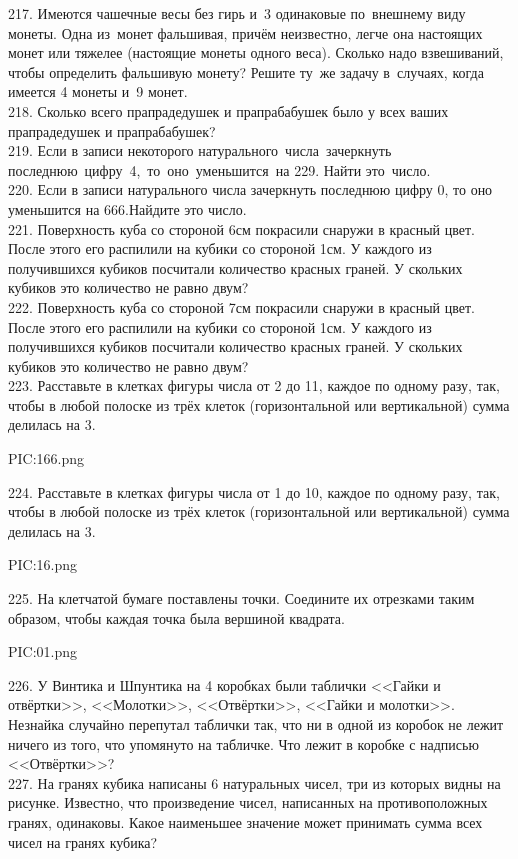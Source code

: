 217. Имеются чашечные весы без гирь и 3 одинаковые по внешнему виду монеты. Одна из монет фальшивая, причём неизвестно, легче она настоящих монет или тяжелее (настоящие монеты одного веса). Сколько надо взвешиваний, чтобы определить фальшивую монету? Решите ту же задачу в случаях, когда имеется 4 монеты и 9 монет.\\
218. Сколько всего прапрадедушек и прапрабабушек было у всех ваших прапрадедушек и прапрабабушек?\\
219. Если в записи некоторого натурального числа зачеркнуть последнюю цифру 4, то оно уменьшится на 229. Найти это число.\\
220. Если в записи натурального числа зачеркнуть последнюю цифру 0, то оно уменьшится на 666.Найдите это число.\\
221. Поверхность куба со стороной 6см покрасили снаружи в красный цвет. После этого его распилили на кубики со стороной 1см. У каждого из получившихся кубиков посчитали количество красных граней. У скольких кубиков это количество не равно двум?\\
222. Поверхность куба со стороной 7см покрасили снаружи в красный цвет. После этого его распилили на кубики со стороной 1см. У каждого из получившихся кубиков посчитали количество красных граней. У скольких кубиков это количество не равно двум?\\
223. Расставьте в клетках фигуры числа от 2 до 11, каждое по одному разу, так, чтобы в любой полоске из трёх клеток (горизонтальной или вертикальной) сумма делилась на 3.
\begin{center}
{{PIC:166.png}}
\end{center}
224. Расставьте в клетках фигуры числа от 1 до 10, каждое по одному разу, так, чтобы в любой полоске из трёх клеток (горизонтальной или вертикальной) сумма делилась на 3.
\begin{center}
{{PIC:16.png}}
\end{center}
225. На клетчатой бумаге поставлены точки. Соедините их отрезками таким образом, чтобы каждая точка была вершиной квадрата.
\begin{center}
{{PIC:01.png}}
\end{center}
226. У Винтика и Шпунтика на 4 коробках были таблички <<Гайки и отвёртки>>, <<Молотки>>, <<Отвёртки>>, <<Гайки и молотки>>. Незнайка случайно перепутал таблички так, что ни в одной из коробок не лежит ничего из того, что упомянуто на табличке. Что лежит в коробке с надписью <<Отвёртки>>?\\
227. На гранях кубика написаны 6 натуральных чисел, три из которых видны на рисунке. Известно, что произведение чисел, написанных на противоположных гранях, одинаковы. Какое наименьшее значение может принимать сумма всех чисел на гранях кубика?
